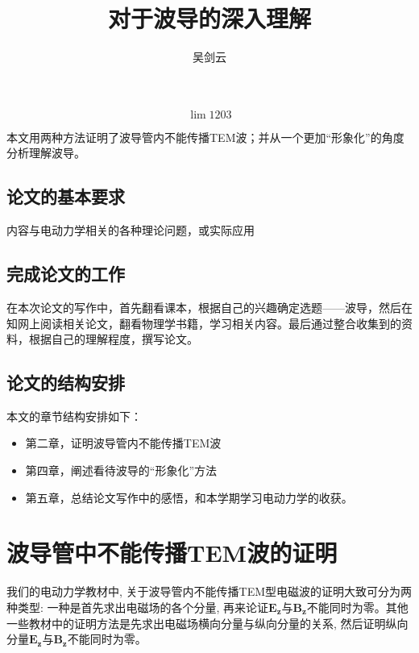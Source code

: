 \documentclass[bachelor]{thesis-uestc}
\title{对于波导的深入理解}
\author{吴剑云}
\begin{document}
\begin{chineseabstract}

\begin{equation}
	\lim 1203
\end{equation}

本文用两种方法证明了波导管内不能传播TEM波；并从一个更加“形象化”的角度分析理解波导。


\end{chineseabstract}

\thesistableofcontents

\thesischapterexordium

\section{论文的基本要求}

内容与电动力学相关的各种理论问题，或实际应用



\section{完成论文的工作}

在本次论文的写作中，首先翻看课本，根据自己的兴趣确定选题——波导，然后在知网上阅读相关论文，翻看物理学书籍，学习相关内容。最后通过整合收集到的资料，根据自己的理解程度，撰写论文。

\section{论文的结构安排}
本文的章节结构安排如下：

\begin{itemize}
	\item 第二章，证明波导管内不能传播TEM波
	\item 第四章，阐述看待波导的“形象化”方法
	\item 第五章，总结论文写作中的感悟，和本学期学习电动力学的收获。
\end{itemize}

\chapter{波导管中不能传播TEM波的证明}
我们的电动力学教材中, 关于波导管内不能传播TEM型电磁波的证明大致可分为两种类型: 一种是首先求出电磁场的各个分量, 再来论证$\bm{E_z}$与$\bm{B_z}$不能同时为零。其他一些教材中的证明方法是先求出电磁场横向分量与纵向分量的关系, 然后证明纵向分量$\bm{E_z}$与$\bm{B_z}$不能同时为零。
\end{document}
